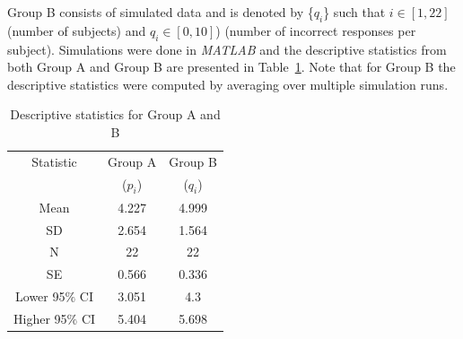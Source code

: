\documentclass[final,1p,times]{elsarticle}
\begin{document}
Group B consists of simulated data and is denoted by \{$q_i$\} such that $i \in [1,22]$ (number of subjects) and $q_i \in [0,10]$) (number of incorrect responses per subject). 
Simulations were done in \textit{MATLAB} and the descriptive statistics from both Group A and Group B are presented in Table~\ref{table:Table2}. Note that for Group B the descriptive statistics were computed by averaging over multiple simulation runs. 
\begin{table}[h!]
	\centering
	\caption{Descriptive statistics for Group A and B}
	\vspace{0.2cm}
	\begin{tabular}{||c c c||} 
		\hline
		Statistic & Group A & Group B \\  
		          & ($p_i$) & ($q_i$) \\ [0.5ex]
		\hline\hline
		Mean & 4.227 & 4.999 \\ 
		SD & 2.654 & 1.564 \\
		N & 22 & 22  \\
		SE & 0.566 & 0.336 \\ 
		Lower 95$\%$ CI & 3.051 & 4.3\\ 
		Higher 95$\%$ CI & 5.404 & 5.698 \\ [1ex]
		\hline
	\end{tabular}
	\label{table:Table2}
\end{table}
\end{document}
